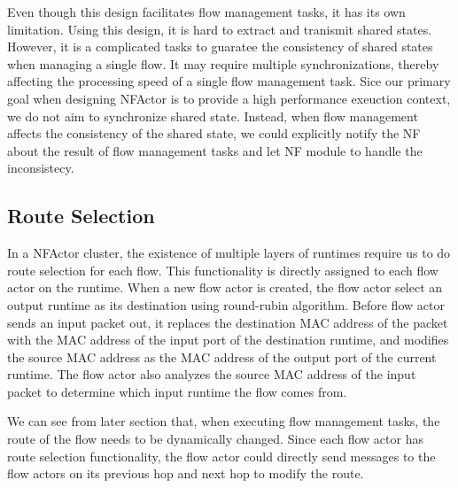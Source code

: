 Even though this design facilitates flow management tasks, it has its own limitation. Using this design, it is hard to extract and tranismit shared states. However, it is a complicated tasks to guaratee the consistency of shared states when managing a single flow. It may require multiple synchronizations, thereby affecting the processing speed of a single flow management task. Sice our primary goal when designing NFActor is to provide a high performance exeuction context, we do not aim to synchronize shared state. Instead, when flow management affects the consistency of the shared state, we could explicitly notify the NF about the result of flow management tasks and let NF module to handle the inconsistecy.



\subsection{Route Selection}


In a NFActor cluster, the existence of multiple layers of runtimes require us to do route selection for each flow. This functionality is directly assigned to each flow actor on the runtime. When a new flow actor is created, the flow actor select an output runtime as its destination using round-rubin algorithm. Before flow actor sends an input packet out, it replaces the destination MAC address of the packet with the MAC address of the input port of the destination runtime, and modifies the source MAC address as the MAC address of the output port of the current runtime. The flow actor also analyzes the source MAC address of the input packet to determine which input runtime the flow comes from.

We can see from later section that, when executing flow management tasks, the route of the flow needs to be dynamically changed. Since each flow actor has route selection functionality, the flow actor could directly send messages to the flow actors on its previous hop and next hop to modify the route.

